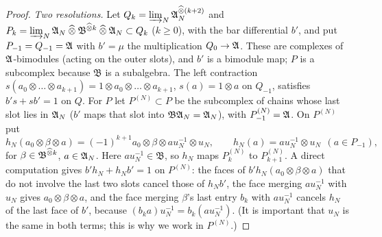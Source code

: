 \begin{proof}
\emph{Two resolutions.} Let \(Q_k=\varinjlim_N\mathfrak A_N^{\mathbin{\widehat\otimes}(k+2)}\) and
\(P_k=\varinjlim_N\mathfrak A_N\mathbin{\widehat\otimes}\mathfrak B^{\mathbin{\widehat\otimes} k}\mathbin{\widehat\otimes}\mathfrak A_N\subset Q_k\)
(\(k\ge0\)), with the bar differential \(b'\), and put
\(P_{-1}=Q_{-1}=\mathfrak A\) with \(b'=\mu\) the multiplication \(Q_0\to\mathfrak A\).
These are complexes of \(\mathfrak A\)-bimodules (acting on the outer slots), and
\(b'\) is a bimodule map; \(P\) is a subcomplex because \(\mathfrak B\) is
a subalgebra. The left contraction \(s(a_0\otimes\dots\otimes a_{k+1})=
1\otimes a_0\otimes\dots\otimes a_{k+1}\), \(s(a)=1\otimes a\) on
\(Q_{-1}\), satisfies \(b's+sb'=1\) on \(Q\). For \(P\) let
\(P^{(N)}\subset P\) be the subcomplex of chains whose last slot lies in
\(\mathfrak A_N\) (\(b'\) maps that slot into \(\mathfrak B\mathfrak A_N=\mathfrak A_N\)), with
\(P^{(N)}_{-1}=\mathfrak A\). On \(P^{(N)}\) put
\[
 h_N(a_0\otimes\beta\otimes a)=(-1)^{k+1}a_0\otimes\beta\otimes
 au_N^{-1}\otimes u_N,\qquad h_N(a)=au_N^{-1}\otimes u_N\ \ (a\in
 P_{-1}),
\]
for \(\beta\in\mathfrak B^{\mathbin{\widehat\otimes} k}\), \(a\in\mathfrak A_N\). Here
\(au_N^{-1}\in\mathfrak B\), so \(h_N\) maps \(P^{(N)}_k\) to
\(P^{(N)}_{k+1}\). A direct computation gives \(b'h_N+h_Nb'=1\) on
\(P^{(N)}\): the faces of \(b'h_N(a_0\otimes\beta\otimes a)\) that do not
involve the last two slots cancel those of \(h_Nb'\), the face merging
\(au_N^{-1}\) with \(u_N\) gives \(a_0\otimes\beta\otimes a\), and the
face merging \(\beta\)'s last entry \(b_k\) with \(au_N^{-1}\) cancels
\(h_N\) of the last face of \(b'\), because \((b_ka)u_N^{-1}=b_k(au_N^{-1})\).
(It is important that \(u_N\) is the same in both terms; this is why we
work in \(P^{(N)}\).)


\end{proof}
